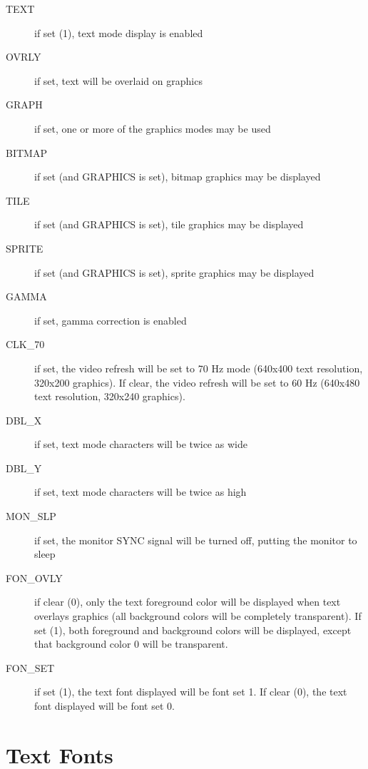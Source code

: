 \begin{description}
    \item[TEXT] if set (1), text mode display is enabled

    \item[OVRLY] if set, text will be overlaid on graphics

    \item[GRAPH] if set, one or more of the graphics modes may be used

    \item[BITMAP] if set (and GRAPHICS is set), bitmap graphics may be displayed

    \item[TILE] if set (and GRAPHICS is set), tile graphics may be displayed

    \item[SPRITE] if set (and GRAPHICS is set), sprite graphics may be displayed

    \item[GAMMA] if set, gamma correction is enabled

    \item[CLK\_70] if set, the video refresh will be set to 70 Hz mode (640x400 text resolution, 320x200 graphics). If clear,
        the video refresh will be set to 60 Hz (640x480 text resolution, 320x240 graphics).

    \item[DBL\_X] if set, text mode characters will be twice as wide

    \item[DBL\_Y] if set, text mode characters will be twice as high
    
    \item[MON\_SLP] if set, the monitor SYNC signal will be turned off, putting the monitor to sleep
    
    \item[FON\_OVLY] if clear (0), only the text foreground color will be displayed when text overlays graphics (all background colors will be completely transparent). If set (1), both foreground and background colors will be displayed, except that background color 0 will be transparent. 
    
    \item[FON\_SET] if set (1), the text font displayed will be font set 1. If clear (0), the text font displayed will be font set 0.
\end{description}

\section*{Text Fonts}
\label{sec:text_font}

